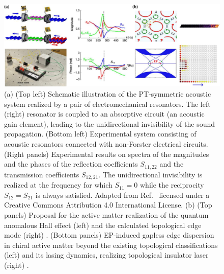 \documentclass{tADP2e}
\theoremstyle{plain}
\theoremstyle{plain}
\theoremstyle{definition}
\begin{document}
\begin{figure}
\begin{center}
\includegraphics[width=14.5cm]{./Figures/fig_3_hydro.pdf}
\end{center}
\caption{ (a) (Top left) Schematic illustration of the PT-symmetric acoustic system realized by a pair of electromechanical resonators. The left (right) resonator is coupled to an absorptive circuit (an acoustic gain element), leading to the unidirectional invisibility of the sound propagation. (Bottom left) Experimental system consisting of acoustic resonators connected with non-Forster electrical circuits. (Right panels) Experimental results on spectra of the magnitudes and the phases of the reflection coefficients $S_{11,22}$ and the transmission coefficients $S_{12,21}$. The unidirectional invisibility is realized at the frequency for which $S_{11}=0$ while the reciprocity $S_{12}=S_{21}$ is always satisfied. Adapted from Ref.~\cite{FR15} licensed under a Creative Commons Attribution 4.0 International License. (b) (Top panels) Proposal for the active matter realization of the quantum anomalous Hall effect (left) and the calculated topological edge mode (right) \cite{SK19}. (Bottom panels) EP-induced gapless edge dispersion in chiral active matter beyond the existing topological classifications (left) and its lasing dynamics, realizing topological insulator laser (right) \cite{SK192}. }
\label{fig:3hydro}
\end{figure}
 
\end{document}
